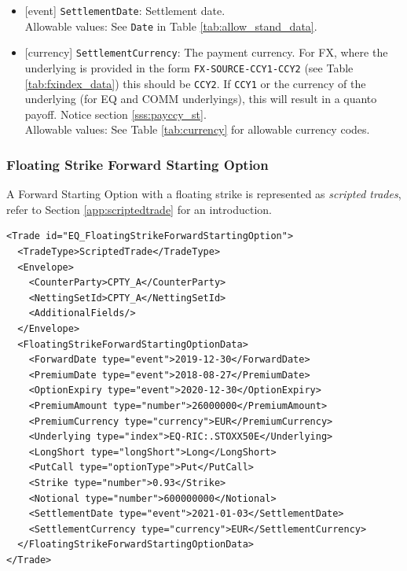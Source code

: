 \begin{itemize}
  Allowable values: Any non-negative number.
  \item{}[event] \lstinline!SettlementDate!: Settlement date. \\
  Allowable values: See \lstinline!Date! in Table \ref{tab:allow_stand_data}.
  \item{}[currency] \lstinline!SettlementCurrency!: The payment currency. For FX, where the underlying is provided
      in the form \lstinline!FX-SOURCE-CCY1-CCY2! (see Table \ref{tab:fxindex_data}) this should
      be \lstinline!CCY2!. If \lstinline!CCY1! or the currency of the underlying (for EQ and
      COMM underlyings), this will result in a quanto payoff. Notice section \ref{sss:payccy_st}. \\
        Allowable values: See Table \ref{tab:currency} for allowable currency codes.
\end{itemize}

\subsubsection{Floating Strike Forward Starting Option}


A Forward Starting Option with a floating strike is represented as {\em scripted trades}, refer to Section
\ref{app:scriptedtrade} for an introduction.

\begin{verbatim}
<Trade id="EQ_FloatingStrikeForwardStartingOption">
  <TradeType>ScriptedTrade</TradeType>
  <Envelope>
    <CounterParty>CPTY_A</CounterParty>
    <NettingSetId>CPTY_A</NettingSetId>
    <AdditionalFields/>
  </Envelope>
  <FloatingStrikeForwardStartingOptionData>
    <ForwardDate type="event">2019-12-30</ForwardDate>
    <PremiumDate type="event">2018-08-27</PremiumDate>
    <OptionExpiry type="event">2020-12-30</OptionExpiry>
    <PremiumAmount type="number">26000000</PremiumAmount>
    <PremiumCurrency type="currency">EUR</PremiumCurrency>
    <Underlying type="index">EQ-RIC:.STOXX50E</Underlying>
    <LongShort type="longShort">Long</LongShort>
    <PutCall type="optionType">Put</PutCall>
    <Strike type="number">0.93</Strike>
    <Notional type="number">600000000</Notional>
    <SettlementDate type="event">2021-01-03</SettlementDate>
    <SettlementCurrency type="currency">EUR</SettlementCurrency>
  </FloatingStrikeForwardStartingOptionData>
</Trade>
\end{verbatim}

